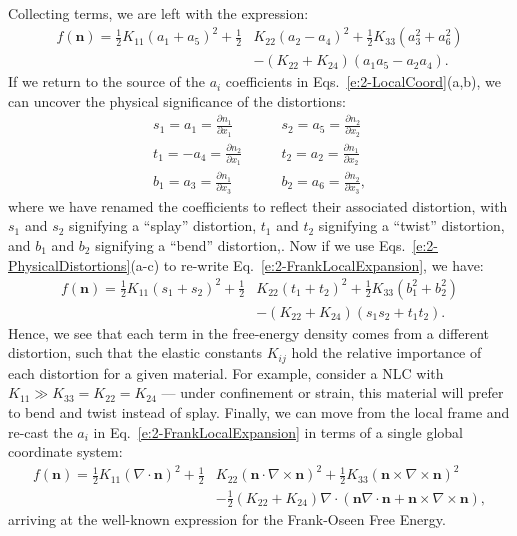 Collecting terms, we are left with the expression:
\begin{align}
  f(\mathbf{n}) = \frac{1}{2}K_{11} (a_1 + a_5)^2 + \frac{1}{2}&K_{22} (a_2 - a_4)^2 + \frac{1}{2}K_{33} (a_3^2 + a_6^2) \nonumber \\
    &- (K_{22} + K_{24}) (a_1 a_5 - a_2 a_4).\label{e:2-FrankLocalExpansion}
\end{align}
If we return to the source of the $a_i$ coefficients in Eqs.~\ref{e:2-LocalCoord}(a,b), we can uncover the physical significance of the distortions:
\label{e:2-PhysicalDistortions}
\begin{align}
  s_1 = a_1 = \frac{\partial n_1}{\partial x_1} \quad & \quad s_2 = a_5 = \frac{\partial n_2}{\partial x_2} \tag{\theequation a} \\
  t_1 = - a_4 = \frac{\partial n_2}{\partial x_1} \quad & \quad t_2 = a_2 = \frac{\partial n_1}{\partial x_2} \tag{\theequation b} \\
  b_1 =  a_3 = \frac{\partial n_1}{\partial x_3} \quad & \quad b_2 = a_6 = \frac{\partial n_2}{\partial x_3}, \tag{\theequation c}
\end{align}
where we have renamed the coefficients to reflect their associated distortion, with $s_1$ and $s_2$ signifying a ``splay'' distortion, $t_1$ and $t_2$ signifying a ``twist'' distortion, and $b_1$ and $b_2$ signifying a ``bend'' distortion,.
Now if we use Eqs.~\ref{e:2-PhysicalDistortions}(a-c) to re-write Eq.~\ref{e:2-FrankLocalExpansion}, we have:
\begin{align}
  f(\mathbf{n}) = \frac{1}{2}K_{11} (s_1 + s_2)^2 + \frac{1}{2}&K_{22} (t_1 + t_2)^2 + \frac{1}{2}K_{33} (b_1^2 + b_2^2) \nonumber \\
    & - (K_{22} + K_{24}) (s_1 s_2 + t_1 t_2).\label{e:2-FrankPhysicalExpansion}
\end{align}
Hence, we see that each term in the free-energy density comes from a different distortion, such that the elastic constants $K_{ij}$ hold the relative importance of each distortion for a given material.
For example, consider a NLC with $K_{11} \gg K_{33} = K_{22} = K_{24}$ --- under confinement or strain, this material will prefer to bend and twist instead of splay.
Finally, we can move from the local frame and re-cast the $a_i$ in Eq.~\ref{e:2-FrankLocalExpansion} in terms of a single global coordinate system:
\begin{align}
  f(\mathbf{n}) = \frac{1}{2}K_{11} (\nabla \cdot \mathbf{n})^2 + \frac{1}{2}&K_{22} (\mathbf{n} \cdot \nabla \times \mathbf{n})^2 + \frac{1}{2}K_{33} (\mathbf{n} \times \nabla \times \mathbf{n})^2 \nonumber \\
    & - \frac{1}{2}(K_{22} + K_{24}) \nabla \cdot (\mathbf{n}\nabla \cdot \mathbf{n} + \mathbf{n} \times \nabla \times \mathbf{n}),\label{e:2-FrankFinalExpansion}
\end{align}
arriving at the well-known expression for the Frank-Oseen Free Energy.\\

